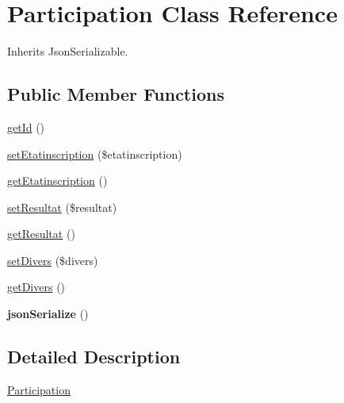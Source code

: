 \hypertarget{class_site_1_1_trail_bundle_1_1_entity_1_1_participation}{}\section{Participation Class Reference}
\label{class_site_1_1_trail_bundle_1_1_entity_1_1_participation}


Inherits Json\+Serializable.

\subsection*{Public Member Functions}
\begin{DoxyCompactItemize}
\item 
\hyperlink{class_site_1_1_trail_bundle_1_1_entity_1_1_participation_a12251d0c022e9e21c137a105ff683f13}{get\+Id} ()
\item 
\hyperlink{class_site_1_1_trail_bundle_1_1_entity_1_1_participation_abae678c8145da67d0196e3f871af2ef9}{set\+Etatinscription} (\$etatinscription)
\item 
\hyperlink{class_site_1_1_trail_bundle_1_1_entity_1_1_participation_a04b7f8d38a0a878b7475caf52e5bf6db}{get\+Etatinscription} ()
\item 
\hyperlink{class_site_1_1_trail_bundle_1_1_entity_1_1_participation_afe1acb7a0b2c77b3d419f11d8f588b4c}{set\+Resultat} (\$resultat)
\item 
\hyperlink{class_site_1_1_trail_bundle_1_1_entity_1_1_participation_a104148d199a274ed6013435beb10a7c8}{get\+Resultat} ()
\item 
\hyperlink{class_site_1_1_trail_bundle_1_1_entity_1_1_participation_a3cd011c02403da03b685505a8033d92d}{set\+Divers} (\$divers)
\item 
\hyperlink{class_site_1_1_trail_bundle_1_1_entity_1_1_participation_abd440cefb04a8f71e935bc9dcc60356e}{get\+Divers} ()
\item 
\hypertarget{class_site_1_1_trail_bundle_1_1_entity_1_1_participation_ad402d8679325bc514874370f02b5c2ac}{}{\bfseries json\+Serialize} ()\label{class_site_1_1_trail_bundle_1_1_entity_1_1_participation_ad402d8679325bc514874370f02b5c2ac}

\end{DoxyCompactItemize}


\subsection{Detailed Description}
\hyperlink{class_site_1_1_trail_bundle_1_1_entity_1_1_participation}{Participation}

